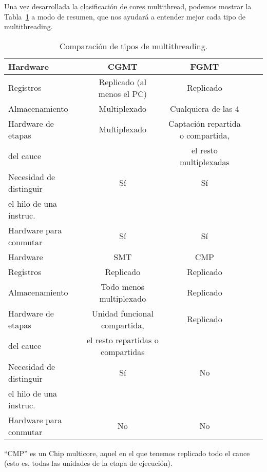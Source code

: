 Una vez desarrollada la clasificación de cores multithread, podemos mostrar la Tabla~\ref{tab:resumen_multithreading} a modo de resumen, que nos ayudará a entender mejor cada tipo de multithreading.
\begin{table}
\footnotesize
\centering
\setlength{\tabcolsep}{4pt}
\begin{tabular}{l c c c c}
    \toprule
    Hardware & CGMT & FGMT \\ 
    \midrule
    Registros & Replicado (al menos el PC) & Replicado \\
    \midrule
    Almacenamiento & Multiplexado & Cualquiera de las 4 \\
    \midrule
    Hardware de etapas & Multiplexado & Captación repartida o compartida, \\
    del cauce & & el resto multiplexadas \\
    \midrule
    Necesidad de distinguir & Sí & Sí \\
    el hilo de una instruc. & & \\
    \midrule
    Hardware para conmutar & Sí & Sí \\
    \toprule %
    Hardware & SMT & CMP \\ 
    \midrule
    Registros & Replicado & Replicado \\
    \midrule
    Almacenamiento & Todo menos multiplexado & Replicado \\
    \midrule
    Hardware de etapas & Unidad funcional compartida, & Replicado \\
    del cauce & el resto repartidas o compartidas & \\
    \midrule
    Necesidad de distinguir & Sí & No \\
    el hilo de una instruc. & & \\
    \midrule
    Hardware para conmutar & No & No \\
    \bottomrule
\end{tabular}
\caption{Comparación de tipos de multithreading.}
\label{tab:resumen_multithreading}
\end{table}
``CMP'' es un Chip multicore, aquel en el que tenemos replicado todo el cauce (esto es, todas las unidades de la etapa de ejecución).

